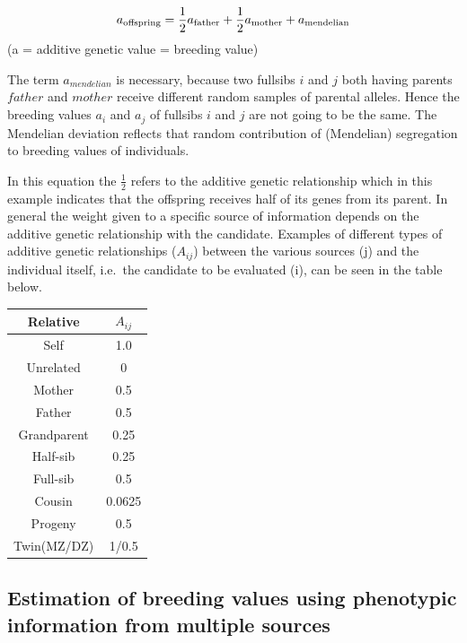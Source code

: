 \documentclass[
]{article}
\begin{document}
\begin{align}
        a_{\text{offspring}}=\frac{1}{2}a_{\text{father}}+\frac{1}{2}a_{\text{mother}}+a_{\text{mendelian}} \notag  
\end{align}
(a = additive genetic value = breeding value)

The term \(a_{mendelian}\) is necessary, because two fullsibs \(i\) and \(j\) both having parents \(father\) and \(mother\) receive different random samples of parental alleles. Hence the breeding values \(a_i\) and \(a_j\) of fullsibs \(i\) and \(j\) are not going to be the same. The Mendelian deviation reflects that random contribution of (Mendelian) segregation to breeding values of individuals.

In this equation the \(\frac{1}{2}\) refers to the additive genetic relationship which in this example indicates that the offspring receives half of its genes from its parent. In general the weight given to a specific source of information depends on the additive genetic relationship with the candidate. Examples of different types of additive genetic relationships (\(A_{ij}\)) between the various sources (j) and the individual itself, i.e.~the candidate to be evaluated (i), can be seen in the table below.

\begin{center} 
\begin{tabular}{|c|c|}
  \hline
  Relative  &  $A_{ij}$\\
  \hline
  Self  &  1.0    \\
  \hline
  Unrelated  &  0    \\
  \hline
  Mother  &  0.5 \\
  \hline
  Father  &  0.5 \\
  \hline
  Grandparent  &  0.25 \\
  \hline
  Half-sib  &  0.25 \\
  \hline
  Full-sib  &  0.5 \\
  \hline
  Cousin  &  0.0625 \\
  \hline
  Progeny  &  0.5 \\
  \hline
  Twin(MZ/DZ)  &  1/0.5 \\
  \hline
\end{tabular}
\end{center}

\subsection{Estimation of breeding values using phenotypic information from multiple sources}\label{estimation-of-breeding-values-using-phenotypic-information-from-multiple-sources}
\end{document}
